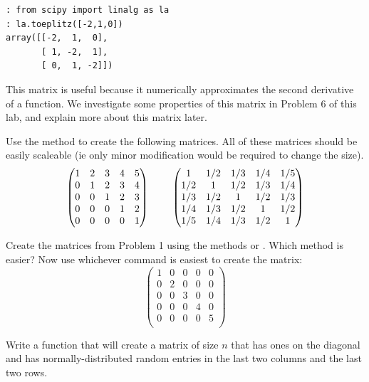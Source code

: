 \begin{lstlisting}[style=python]
: from scipy import linalg as la
: la.toeplitz([-2,1,0])
array([[-2,  1,  0],
       [ 1, -2,  1],
       [ 0,  1, -2]])
\end{lstlisting}

This matrix is useful because it numerically approximates the second derivative of a function. We investigate some properties of this matrix in Problem 6 of this lab, and explain more about this matrix later.

\begin{problem}
Use the  method to create the following matrices. All of these matrices should be easily scaleable (ie only minor modification would be required to change the size).
\[
\begin{pmatrix}
1&2&3&4&5\\
0&1&2&3&4\\
0&0&1&2&3 \\
0&0&0&1&2 \\
0&0&0&0&1 \\
\end{pmatrix}
\hspace{8mm}
\begin{pmatrix}
1&1/2&1/3 & 1/4 &1/5\\
1/2&1&1/2&1/3&1/4\\
1/3&1/2&1&1/2&1/3 \\
1/4&1/3&1/2&1&1/2 \\
1/5&1/4&1/3&1/2&1 \\
\end{pmatrix}
\]
\end{problem}

\begin{problem}
Create the matrices from Problem 1 using the methods  or . Which method is easier? Now use whichever command is easiest to create the matrix:
\[
\begin{pmatrix}
1&0&0&0&0\\
0&2&0&0&0\\
0&0&3&0&0 \\
0&0&0&4&0 \\
0&0&0&0&5 \\
\end{pmatrix}
\]
\end{problem}
 
\begin{problem}
Write a function that will create a matrix of size $n$ that has ones on the diagonal and has normally-distributed random entries in the last two columns and the last two rows.
\end{problem}

